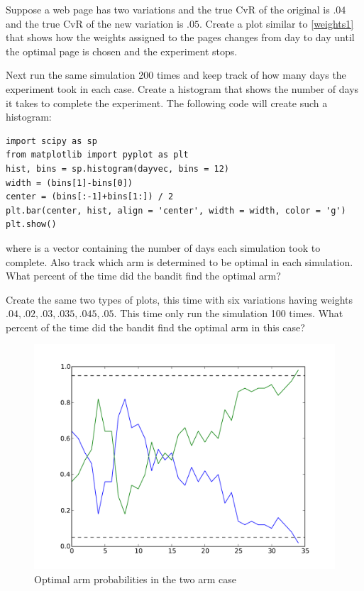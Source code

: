\begin{problem}
Suppose a web page has two variations and the true CvR of the original is $.04$ and the true CvR of the new variation is $.05$.  Create a plot similar to \ref{weights1} that shows how the weights assigned to the pages changes from day to day until the optimal page is chosen and the experiment stops.

Next run the same simulation 200 times and keep track of how many days the experiment took in each case.  Create a histogram that shows the number of days it takes to complete the experiment.  The following code will create such a histogram:

\begin{lstlisting}[style = python]
import scipy as sp
from matplotlib import pyplot as plt
hist, bins = sp.histogram(dayvec, bins = 12)
width = (bins[1]-bins[0])
center = (bins[:-1]+bins[1:]) / 2
plt.bar(center, hist, align = 'center', width = width, color = 'g')
plt.show()
\end{lstlisting}
where  is a vector containing the number of days each simulation took to complete.  Also track which arm is determined to be optimal in each simulation.  What percent of the time did the bandit find the optimal arm?

Create the same two types of plots, this time with six variations having weights $.04,.02,.03,.035,.045,.05$.  This time only run the simulation 100 times.  What percent of the time did the bandit find the optimal arm in this case?
\end{problem}

\begin{figure}\label{fig:weights1}
\begin{center}
        \includegraphics[scale=0.4]{./Applications/MarkDecProc/weights1.pdf}
        \caption{Optimal arm probabilities in the two arm case}
\end{center}
\end{figure}

